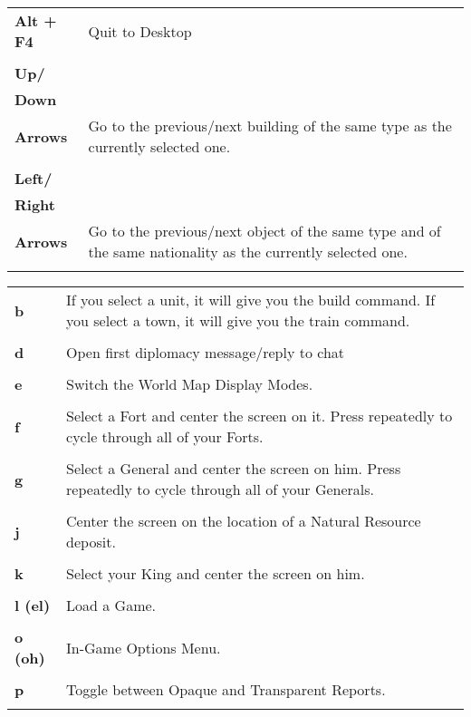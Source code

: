 \begin{tabular}{p{1in} p{3in}}
	\textbf{Alt + F4} & Quit to Desktop\\ \\
	\textbf{Up/}\\
	\textbf{Down}\\
	\textbf{Arrows} & Go to the previous/next building of the same type as the currently selected one.\\ \\	
	\textbf{Left/}\\
	\textbf{Right}\\
	\textbf{Arrows} & Go to the previous/next object of the same type and of the same nationality as the currently selected one.\\ \\
\end{tabular}	

\begin{tabular}{p{1in} p{3in}}
	\textbf{b} & If you select a unit, it will give you the build command. If you select a town, it will give you the train command.\\ \\
		
		
	\textbf{d} & Open first diplomacy message/reply to chat\\ \\
	\textbf{e} & Switch the World Map Display Modes.\\ \\
	\textbf{f} & Select a Fort and center the screen on it. Press repeatedly to cycle through all of your Forts. \\ \\

		
	\textbf{g} & Select a General and center the screen on him. Press repeatedly to cycle through all of your Generals.\\ \\	
	\textbf{j} & Center the screen on the location of a Natural Resource deposit.\\ \\	
	\textbf{k} & Select your King and center the screen on him.\\ \\
	\textbf{l (el)} & Load a Game.\\ \\
	\textbf{o (oh)} & In-Game Options Menu.\\ \\	
	\textbf{p} & Toggle between Opaque and Transparent Reports.\\ \\
\end{tabular}

